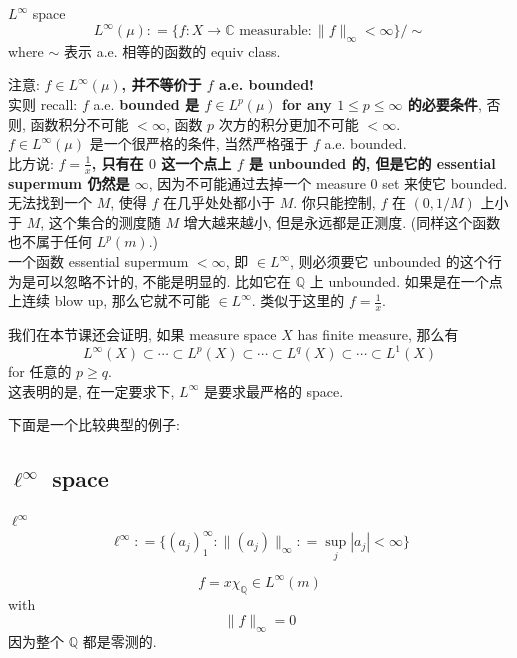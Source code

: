 \documentclass[lang=cn,11pt]{elegantbook}
\begin{document}
\begin{definition}{$L^\infty$ space} \[
    L^\infty(\mu) : = \{ f:X \to \mathbb{C} \text{ measurable} : \| f\|_\infty < \infty \} / \sim
    \]
    where $\sim$ 表示 a.e. 相等的函数的 equiv class.
\end{definition}
\begin{remark}
    注意: \textbf{$f\in L^\infty(\mu)$, 并不等价于 $f$ a.e. bounded!}\\
实则 recall: $f$ a.e. \textbf{bounded  是 $f \in L^p (\mu)$ for any $1\leq p \leq \infty$ 的必要条件}, 否则, 函数积分不可能 $<\infty$, 函数 $p$ 次方的积分更加不可能 $<\infty$.\\
$f\in L^\infty(\mu)$ 是一个很严格的条件, 当然严格强于 $f$ a.e. bounded. \\
比方说: \textbf{$f = \frac{1}{x}$, 只有在 $0$ 这一个点上 $f$ 是 unbounded 的, 但是它的 essential supermum 仍然是 $\infty$}, 因为不可能通过去掉一个 measure $0$ set 来使它 bounded. \\
无法找到一个 $M$, 使得 $f$ 在几乎处处都小于 $M$. 你只能控制, $f$ 在 $(0,1/M)$ 上小于 $M$, 这个集合的测度随 $M$ 增大越来越小, 但是永远都是正测度.
(同样这个函数也不属于任何 $L^p(m)$.)\\
一个函数 essential supermum $<\infty$, 即 $\in L^\infty$, 则必须要它 unbounded 的这个行为是可以忽略不计的, 不能是明显的. 比如它在 $\mathbb{Q}$ 上 unbounded. 如果是在一个点上连续 blow up, 那么它就不可能 $\in L^\infty$. 类似于这里的  $f = \frac{1}{x}$.\\
\end{remark}
\begin{remark}
    我们在本节课还会证明, 如果 measure space $X$ has finite measure, 那么有 \[
    L^\infty(X) \subset \cdots \subset L^p(X)\subset \cdots  \subset L^{q} (X)\subset \cdots \subset L^1(X)
    \]
for 任意的 $p \geq q$.\\ 这表明的是, 在一定要求下, $L^\infty$ 是要求最严格的 space.
\end{remark}


下面是一个比较典型的例子:
\subsection{$\ell^\infty$ space}
\begin{definition}{$\ell^\infty$} \[
    \ell^\infty : = \{  (a_j)_1^\infty : \| (a_j)\|_\infty : = \sup_j |a_j|  <\infty \}
    \]\end{definition}
\begin{example}
    \[
    f = x\chi_{\mathbb{Q}} \in L^\infty (m)
    \]with \[
    \| f\|_\infty = 0
    \]
    因为整个 $\mathbb{Q}$ 都是零测的.
\end{example}
\end{document}
